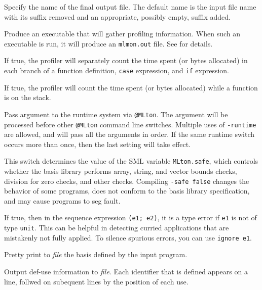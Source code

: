 \begin{description}
Specify the name of the final output file. The default name is the
input file name with its suffix removed and an appropriate, possibly
empty, suffix added.

Produce an executable that will gather profiling information.  When
such an executable is run, it will produce an {\tt mlmon.out} file.
See  for details.

If true, the profiler will separately count the time spent (or bytes
allocated) in each branch of a function definition, {\tt case}
expression, and {\tt if} expression.

If true, the profiler will count the time spent (or bytes allocated)
while a function is on the stack.

Pass argument to the runtime system via {\tt @MLton}.  The argument
will be processed before other {\tt @MLton} command line switches.
Multiple uses of {\tt -runtime} are allowed, and will pass all the
arguments in order.  If the same runtime switch occurs more than once,
then the last setting will take effect.

This switch determines the value of the SML variable {\tt MLton.safe},
which controls whether the basis library performs array, string, and
vector bounds checks, division for zero checks, and other checks.
Compiling {\tt -safe false} changes the behavior of some programs,
does not conform to the basis library specification, and may cause
programs to seg fault.

If true, then in the sequence expression {\tt (e1; e2)}, it is a type
error if {\tt e1} is not of type {\tt unit}.  This can be helpful in
detecting curried applications that are mistakenly not fully applied.
To silence spurious errors, you can use {\tt ignore e1}.

Pretty print to {\it file} the basis defined by the input program.

Output def-use information to {\it file}.  Each identifier that is
defined appears on a line, follwed on subequent lines by the position
of each use.


\end{description}
